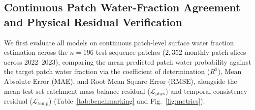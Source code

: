 \documentclass[preprint,12pt]{elsarticle}
\begin{document}
\subsection{Continuous Patch Water-Fraction Agreement and Physical Residual Verification}
We first evaluate all models on continuous patch-level surface water fraction estimation across the $n = 196$ test sequence patches ($2,352$ monthly patch slices across 2022--2023), comparing the mean predicted patch water probability against the target patch water fraction via the coefficient of determination ($R^2$), Mean Absolute Error (MAE), and Root Mean Square Error (RMSE), alongside the mean test-set catchment mass-balance residual ($\mathcal{L}_{\text{phys}}$) and temporal consistency residual ($\mathcal{L}_{\text{temp}}$) (Table~\ref{tab:benchmarking} and Fig.~\ref{fig:metrics}).

\begin{table}[htbp]
\caption{Verified Continuous Patch Water-Fraction Agreement ($n=196$ Test Patches) and Physical/Temporal Residuals}
\label{tab:benchmarking}
\centering
{}
\end{table}
\end{document}
